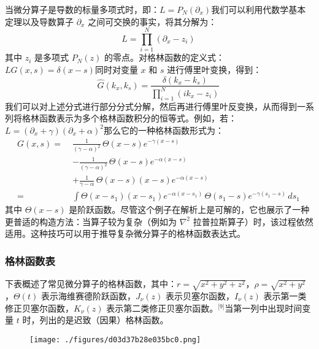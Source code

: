 当微分算子是导数的标量多项式时，即：$L = P_N(\partial_x)$我们可以利用代数学基本定理以及导数算子 $\partial_x$ 之间可交换的事实，将其分解为：
$$
L = \prod_{i=1}^{N} (\partial_x - z_i)~
$$
其中 $z_i$ 是多项式 $P_N(z)$ 的零点。对格林函数的定义式：$L G(x, s) = \delta(x - s)$同时对变量 $x$ 和 $s$ 进行傅里叶变换，得到：
$$
\widehat{G}(k_x, k_s) = \frac{\delta(k_x - k_s)}{\prod_{i=1}^{N} (ik_x - z_i)}~
$$
我们可以对上述分式进行部分分式分解，然后再进行傅里叶反变换，从而得到一系列将格林函数表示为多个格林函数积分的恒等式。例如，若：$L = (\partial_x + \gamma)(\partial_x + \alpha)^2$那么它的一种格林函数形式为：
$$
\begin{aligned}
G(x, s) =\;& \frac{1}{(\gamma - \alpha)^2} \, \Theta(x - s) e^{-\gamma(x - s)} \\
& - \frac{1}{(\gamma - \alpha)^2} \, \Theta(x - s) e^{-\alpha(x - s)} \\
& + \frac{1}{\gamma - \alpha} \, \Theta(x - s) (x - s) e^{-\alpha(x - s)} \\
=\;& \int \Theta(x - s_1)(x - s_1) e^{-\alpha(x - s_1)} \, \Theta(s_1 - s) e^{-\gamma(s_1 - s)} \, ds_1
\end{aligned}~
$$
其中 $\Theta(x - s)$ 是阶跃函数。尽管这个例子在解析上是可解的，它也展示了一种更普适的构造方法：当算子较为复杂（例如为 $\nabla^2$ 拉普拉斯算子）时，该过程依然适用。这种技巧可以用于推导复杂微分算子的格林函数表达式。
\subsubsection{格林函数表}
下表概述了常见微分算子的格林函数，其中：$r = \sqrt{x^2 + y^2 + z^2}$，$\rho = \sqrt{x^2 + y^2}$，$\Theta(t)$ 表示海维赛德阶跃函数，$J_{\nu}(z)$ 表示贝塞尔函数，$I_{\nu}(z)$ 表示第一类修正贝塞尔函数，$K_{\nu}(z)$ 表示第二类修正贝塞尔函数。\(^\text{[9]}\)当第一列中出现时间变量 $t$ 时，列出的是迟致（因果）格林函数。
\begin{figure}[ht]
\centering
\texttt{[image: ./figures/d03d37b28e035bc0.png]}
\caption{} \label{fig_GLhs_2}
\end{figure}